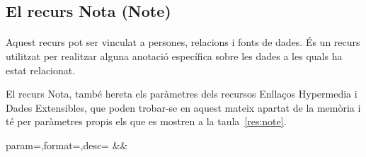 \subsection{El recurs Nota (Note)}

    \paragraph{}
    Aquest recurs pot ser vinculat a persones, relacions i fonts de dades. És un recurs utilitzat per realitzar alguna anotació específica sobre les dades a les quals ha estat relacionat.

    El recurs Nota, també hereta els paràmetres dels recursos Enllaços Hypermedia i Dades Extensibles, que poden trobar-se en aquest mateix apartat de la memòria i té per paràmetres propis els que es mostren a la taula~\ref{res:note}.

    \begin{center}
             {param=\param,format=\format,desc=\desc}
             {\param&\format&\desc}
     \end{center}
